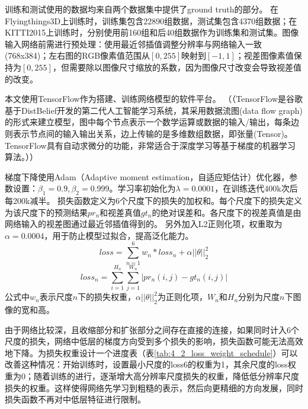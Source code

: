 训练和测试使用的数据均来自两个数据集中提供了ground truth的部分。
在Flyingthings3D上训练时，训练集包含22890组数据，测试集包含4370组数据；在KITTI2015上训练时，分别使用前160组和后40组数据作为训练集和测试集。图像输入网络前需进行预处理：使用最近邻插值调整分辨率与网络输入一致(768x384)；左右图的RGB像素值范围从$[0, 255]$映射到$[-1, 1]$；视差图像素值保持为$[0, 255]$，但需要除以图像尺寸缩放的系数，因为图像尺寸改变会导致视差值的改变。

本文使用TensorFlow\cite{abadi2016tensorflow}作为搭建、训练网络模型的软件平台。
（（TensorFlow是谷歌基于DistBelief开发的第二代人工智能学习系统，其采用数据流图(data flow graph)的形式来建立模型，图中每个节点表示一个数学运算或数据的输入/输出，每条边则表示节点间的输入输出关系，边上传输的是多维数组数据，即张量(Tensor)。TensorFlow具有自动求微分的功能，非常适合于深度学习等基于梯度的机器学习算法。））

梯度下降使用Adam（Adaptive moment estimation，自适应矩估计）优化器\cite{kingma2014adam}，参数设置：$\beta_1=0.9, \beta_2=0.999$。学习率初始化为$\lambda=0.0001$，在训练迭代400k次后每200k减半。
损失函数定义为6个尺度下的损失的加权和。每个尺度下的损失定义为该尺度下的预测结果$pr_n$和视差真值$gt_n$的绝对误差和。各尺度下的视差真值是由网络输入的视差图通过最近邻插值得到的。
另外加入L2正则化项，权重取为$\alpha=0.0004$，用于防止模型过拟合，提高泛化能力。
\begin{equation}\label{eq:4_2_loss_all}
loss = \sum_{n=1}^{6}{w_n * loss_n} + \alpha ||\theta||_2^2
\end{equation}
\begin{equation}\label{eq:4_2_loss_single}
loss_n = \sum_{i=1}^{H_n}\sum_{j=1}^{W_n}{|pr_n(i, j) - gt_n(i, j)|}
\end{equation}
公式中$w_n$表示尺度$n$下的损失权重，$\alpha||\theta||_2^2$为正则化项，$W_n$和$H_n$分别为尺度$n$下图像的宽和高。

由于网络比较深，且收缩部分和扩张部分之间存在直接的连接，如果同时计入6个尺度的损失，网络中低层的梯度方向受到多个损失的影响，损失函数可能无法高效地下降。为损失权重设计一个进度表（表\ref{tab:4_2_loss_weight_schedule}）可以改善这种情况：开始训练时，设置最小尺度的loss6的权重为1，其余尺度的loss权重为0；随着训练的进行，逐渐增大高分辨率尺度损失的权重，降低低分辨率尺度损失的权重。这样使得网络先学习到粗糙的表示，然后向更精细的方向发展，同时损失函数不再对中低层特征进行限制。

